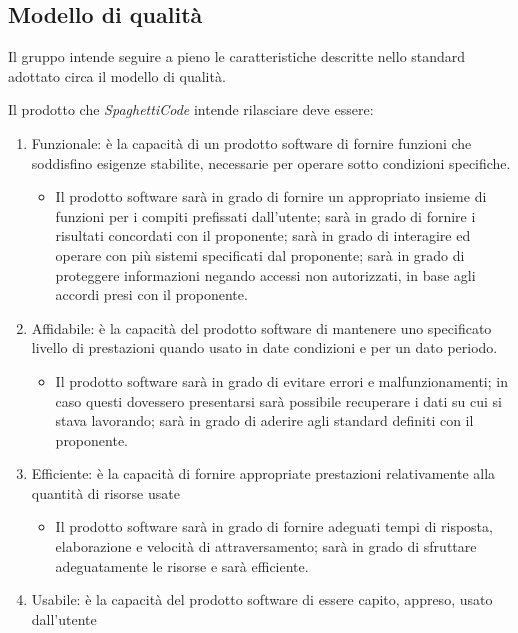 \documentclass[../piano_di_qualifica.tex]{subfiles}
\begin{document}
\subsection{Modello di qualità}
Il gruppo intende seguire a pieno le caratteristiche descritte nello standard adottato circa il modello di qualità.\par
Il prodotto che \emph{SpaghettiCode} intende rilasciare deve essere:\par
\begin{enumerate}
	\item Funzionale: è la capacità di un prodotto software di fornire funzioni che soddisfino esigenze stabilite, necessarie per operare sotto condizioni specifiche.
	      \begin{itemize}
		      \item Il prodotto software sarà in grado di fornire un appropriato insieme di funzioni per i compiti prefissati dall’utente; sarà in grado di fornire i risultati concordati con il proponente; sarà in grado di interagire ed operare con più sistemi specificati dal proponente; sarà in grado di proteggere informazioni negando accessi non autorizzati, in base agli accordi presi con il proponente.
	      \end{itemize}
	\item Affidabile: è la capacità del prodotto software di mantenere uno specificato livello di prestazioni quando usato in date condizioni e per un dato periodo.
	      \begin{itemize}
		      \item Il prodotto software sarà in grado di evitare errori e malfunzionamenti; in caso questi dovessero presentarsi sarà possibile recuperare i dati su cui si stava lavorando; sarà in grado di aderire agli standard definiti con il proponente.
	      \end{itemize}
	\item Efficiente: è la capacità di fornire appropriate prestazioni relativamente alla quantità di risorse usate
	      \begin{itemize}
		      \item Il prodotto software sarà in grado di fornire adeguati tempi di risposta, elaborazione e velocità di attraversamento; sarà in grado di sfruttare adeguatamente le risorse e sarà efficiente.
	      \end{itemize}
	\item Usabile: è la capacità del prodotto software di essere capito, appreso, usato dall'utente
	      \begin{itemize}

\end{itemize}
\end{enumerate}
\end{document}
